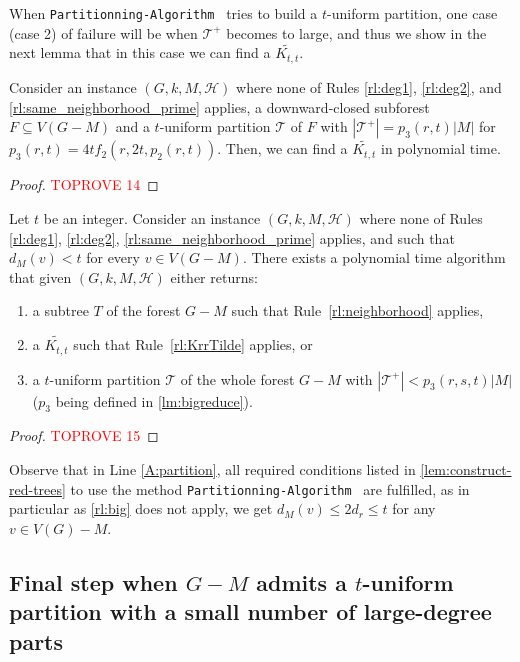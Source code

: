 \documentclass{amsart}
\newcommand{\algopart }{\texttt{Partitionning-Algorithm}~ }
\newcommand{\mT}{\mathcal{T}}
\newcommand{\mH}{\mathcal{H}}
\newcommand{\KttTilde}{\widetilde{K_{t,t}}}
\newcommand{\ruleref}[1]{\hyperref[#1]{\ref*{#1}}}
\begin{document}
When \algopart tries to build a $t$-uniform partition, one case (case 2) of failure will be when $\mT^+$ becomes to large, 
and thus we show in the next lemma that in this case we can find a $\KttTilde$.
\begin{lemma}\label{lm:bigreduce}
   Consider an instance $(G, k, M, \mH)$ where none of Rules \ruleref{rl:deg1}, \ruleref{rl:deg2}, and \ruleref{rl:same_neighborhood_prime} applies,
 a downward-closed subforest $F \subseteq V(G-M)$ and a $t$-uniform partition $\mT$ of $F$ with $|\mT^+|=p_3(r,t)|M|$ for $p_3(r,t)=4tf_2(r,2t,p_2(r,t))$. 
 Then, we can find a $\KttTilde$ in polynomial time.
\end{lemma}
\begin{proof}\textcolor{red}{TOPROVE 14}\end{proof}
\begin{lemma}\label{lem:construct-red-trees}
Let $t$ be an integer. Consider an instance $(G, k, M, \mH)$ where none of Rules \ruleref{rl:deg1}, \ruleref{rl:deg2}, \ruleref{rl:same_neighborhood_prime} applies, and such that $d_M(v)< t$ for every $v\in V(G-M)$.
There exists a polynomial time algorithm that given $(G, k, M,\mH)$ either returns:
\begin{enumerate}
    \item \label{part:case1} a subtree $T$ of the forest $G-M$ such that Rule~\ruleref{rl:neighborhood} applies,
\item \label{part:case2} a $\KttTilde$ such that Rule~\ruleref{rl:KrrTilde} applies, or
    \item \label{part:case3} a $t$-uniform partition $\mT$ of the whole forest $G-M$ with $|\mT^+|<p_3(r,s,t)|M|$ ($p_3$ being defined in \autoref{lm:bigreduce}).
\end{enumerate}

\end{lemma}

\begin{proof}\textcolor{red}{TOPROVE 15}\end{proof}

\begin{remark}
Observe that in Line \ref{A:partition}, all required conditions listed in \autoref{lem:construct-red-trees} to use the method \algopart are fulfilled, as in particular as \ruleref{rl:big} does not apply, we get $d_M(v) \le 2d_r \le t$ for any $v \in V(G)-M$.
\end{remark}


\subsection{Final step when \texorpdfstring{$G-M$}{G-M} admits a \texorpdfstring{$t$}{t}-uniform partition with a small number of large-degree parts}\label{ssec:step4}
\end{document}
